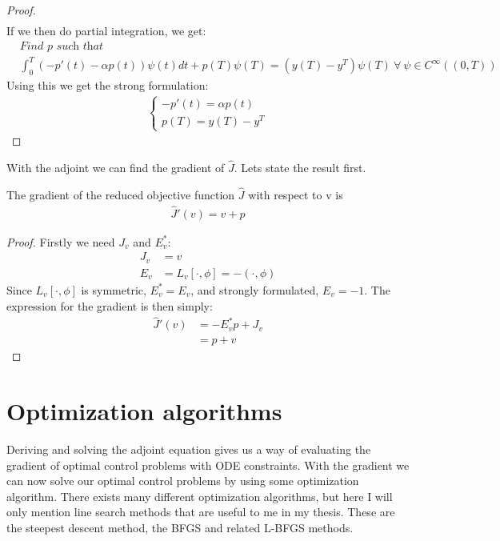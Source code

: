 \begin{proof}
\begin{align*}
\end{align*}
If we then do partial integration, we get:
\begin{align*}
&\textit{Find $p$ such that}\\
&\int_0^T(-p'(t)-\alpha p(t))\psi(t)dt +p(T)\psi(T)= (y(T)-y^T)\psi(T)\ \forall \ \psi \in C^{\infty}((0,T))
\end{align*}
Using this we get the strong formulation:
\begin{align*}
   \left\{
     \begin{array}{lr}
       -p'(t) = \alpha p(t) \\
       p(T) = y(T)-y^T
     \end{array}
   \right.
\end{align*}
\end{proof}
With the adjoint we can find the gradient of $\hat{J}$. Lets state the result first.
\begin{theorem}
The gradient of the reduced objective function $\hat{J}$ with respect to v is
\begin{align}
\hat{J}'(v)=v+p 
\end{align} 
\end{theorem}
\begin{proof}
Firstly we need $J_v$ and $E_v^*$:
\begin{align*}
J_v &= v \\
E_v &= L_v[\cdot,\phi] = -(\cdot,\phi)
\end{align*}
Since $L_v[\cdot,\phi]$ is symmetric, $E_v^*=E_v$, and strongly formulated, $E_v=-1$. The expression for the gradient is then simply:
\begin{align*}
\hat{J}'(v)&=-E_v^*p + J_v \\
&= p+v 
\end{align*} 
\end{proof}
\section{Optimization algorithms}
Deriving and solving the adjoint equation gives us a way of evaluating the gradient of optimal control problems with ODE constraints. With the gradient we can now solve our optimal control problems by using some optimization algorithm. There exists many different optimization algorithms, but here I will only mention line search methods that are useful to me in my thesis. These are the steepest descent method, the BFGS and related L-BFGS methods.  
